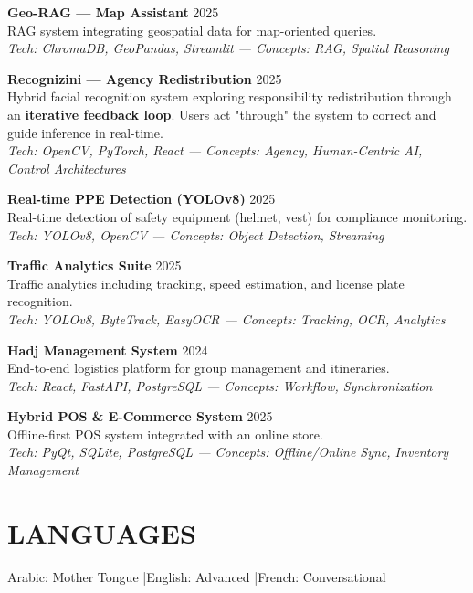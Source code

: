 \documentclass[a4paper,12pt]{article}
\begin{document}
{\textbf{Geo-RAG — Map Assistant} \hfill 2025 \\
RAG system integrating geospatial data for map-oriented queries. \\
\textit{Tech: ChromaDB, GeoPandas, Streamlit — Concepts: RAG, Spatial Reasoning}

\textbf{Recognizini — Agency Redistribution} \hfill 2025 \\
Hybrid facial recognition system exploring responsibility redistribution through an \textbf{iterative feedback loop}. Users act "through" the system to correct and guide inference in real-time. \\
\textit{Tech: OpenCV, PyTorch, React — Concepts: Agency, Human-Centric AI, Control Architectures}

\textbf{Real-time PPE Detection (YOLOv8)} \hfill 2025 \\
Real-time detection of safety equipment (helmet, vest) for compliance monitoring. \\
\textit{Tech: YOLOv8, OpenCV — Concepts: Object Detection, Streaming}

\textbf{Traffic Analytics Suite} \hfill 2025 \\
Traffic analytics including tracking, speed estimation, and license plate recognition. \\
\textit{Tech: YOLOv8, ByteTrack, EasyOCR — Concepts: Tracking, OCR, Analytics}

\textbf{Hadj Management System} \hfill 2024 \\
End-to-end logistics platform for group management and itineraries. \\
\textit{Tech: React, FastAPI, PostgreSQL — Concepts: Workflow, Synchronization}

\textbf{Hybrid POS \& E-Commerce System} \hfill 2025 \\
Offline-first POS system integrated with an online store. \\
\textit{Tech: PyQt, SQLite, PostgreSQL — Concepts: Offline/Online Sync, Inventory Management}

} %

\section{LANGUAGES}
Arabic: Mother Tongue \quad|\quad English: Advanced \quad|\quad French: Conversational
\end{document}
